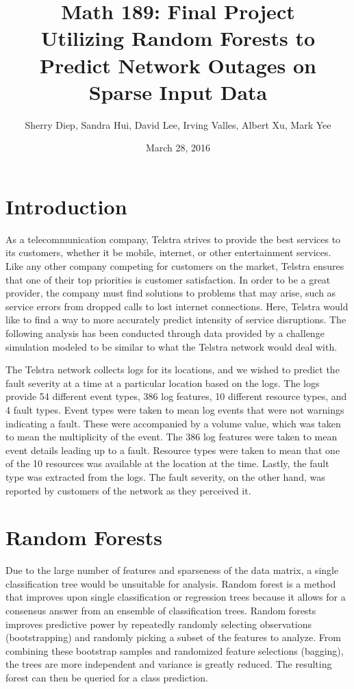 \documentclass[11pt]{article} %
\title{\textbf{Math 189: Final Project}\\Utilizing Random Forests to Predict Network Outages on Sparse Input Data}
\author{Sherry Diep, Sandra Hui, David Lee, Irving Valles, Albert Xu, Mark Yee}
\date{March 28, 2016}
\begin{document}
\maketitle

\section*{Introduction}
As a telecommunication company, Telstra strives to provide the best services to its customers, whether it be mobile, internet, or other entertainment services. Like any other company competing for customers on the market, Telstra ensures that one of their top priorities is customer satisfaction. In order to be a great provider, the company must find solutions to problems that may arise, such as service errors from dropped calls to lost internet connections. Here, Telstra would like to find a way to more accurately predict intensity of service disruptions. The following analysis has been conducted through data provided by a challenge simulation modeled to be similar to what the Telstra network would deal with.

The Telstra network collects logs for its locations, and we wished to predict the fault severity at a time at a particular location based on the logs. The logs provide 54 different event types, 386 log features, 10 different resource types, and 4 fault types. Event types were taken to mean log events that were not warnings indicating a fault. These were accompanied by a volume value, which was taken to mean the multiplicity of the event. The 386 log features were taken to mean event details leading up to a fault. Resource types were taken to mean that one of the 10 resources was available at the location at the time. Lastly, the fault type was extracted from the logs. The fault severity, on the other hand, was reported by customers of the network as they perceived it.

\section*{Random Forests}
Due to the large number of features and sparseness of the data matrix, a single classification tree would be unsuitable for analysis. Random forest is a method that improves upon single classification or regression trees because it allows for a consensus answer from an ensemble of classification trees. Random forests improves predictive power by repeatedly randomly selecting observations (bootstrapping) and randomly picking a subset of the features to analyze. From combining these bootstrap samples and randomized feature selections (bagging), the trees are more independent and variance is greatly reduced. The resulting forest can then be queried for a class prediction. 
\end{document}
